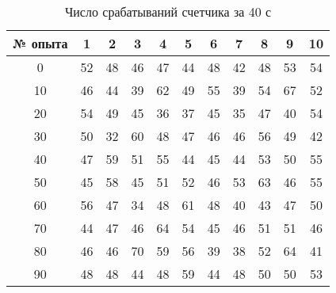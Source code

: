\documentclass[a4paper]{article}
\begin{document}
\begin{table}[h!]
\centering
\large
\caption{Число срабатываний счетчика за 40 с}
\label{tab:experiments}
\begin{tabular}{|c|*{10}{c|}} %
\hline %
\textbf{№ опыта} & \textbf{1} & \textbf{2} & \textbf{3} & \textbf{4} & \textbf{5} & \textbf{6} & \textbf{7} & \textbf{8} & \textbf{9} & \textbf{10} \\
\hline %
0                & 52         & 48         & 46         & 47         & 44         & 48         & 42         & 48         & 53         & 54          \\
\hline
10               & 46         & 44         & 39         & 62         & 49         & 55         & 39         & 54         & 67         & 52          \\
\hline
20               & 54         & 49         & 45         & 36         & 37         & 45         & 35         & 47         & 40         & 54          \\
\hline
30               & 50         & 32         & 60         & 48         & 47         & 46         & 46         & 56         & 49         & 42          \\
\hline
40               & 47         & 59         & 51         & 55         & 44         & 45         & 44         & 53         & 50         & 55          \\
\hline
50               & 45         & 58         & 45         & 51         & 52         & 46         & 53         & 63         & 46         & 55          \\
\hline
60               & 56         & 47         & 34         & 48         & 61         & 48         & 40         & 43         & 47         & 50          \\
\hline
70               & 44         & 47         & 46         & 64         & 54         & 45         & 46         & 51         & 51         & 46          \\
\hline
80               & 46         & 46         & 70         & 59         & 56         & 39         & 38         & 52         & 64         & 41          \\
\hline
90               & 48         & 48         & 44         & 48         & 59         & 44         & 48         & 50         & 50         & 53          \\
\hline
\end{tabular}
\end{table}
\end{document}
